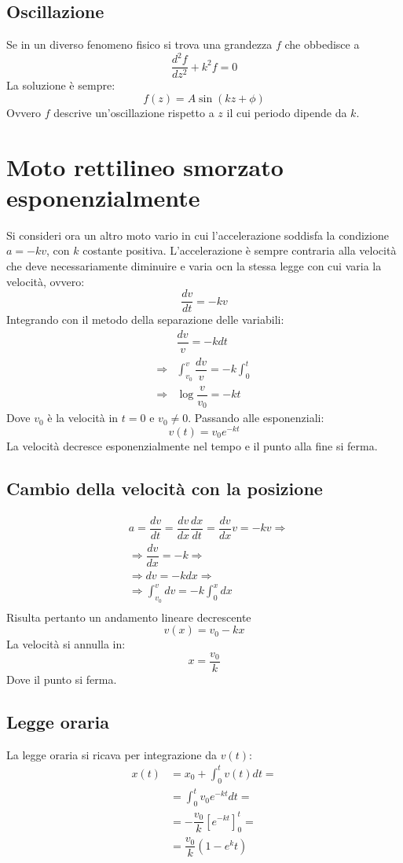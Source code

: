 \documentclass[class=book, crop=false, oneside, 12pt]{standalone}
\begin{document}
	\subsection{Oscillazione}
	Se in un diverso fenomeno fisico si trova una grandezza $f$ che obbedisce a
	$$\dfrac{d^2f}{dz^2}+k^2f=0$$
	La soluzione \`e sempre:
	$$f(z)=A\sin(kz+\phi)$$
	Ovvero $f$ descrive un'oscillazione rispetto a $z$ il cui periodo dipende da $k$.
\section{Moto rettilineo smorzato esponenzialmente}
Si consideri ora un altro moto vario in cui l'accelerazione soddisfa la condizione $a = -kv$, con $k$ costante positiva.
L'accelerazione \`e sempre contraria alla velocit\`a che deve necessariamente diminuire e varia ocn la stessa legge con cui varia la velocit\`a, ovvero:
$$\dfrac{dv}{dt} = -kv$$
Integrando con il metodo della separazione delle variabili:
\begin{align*}
	&\dfrac{dv}{v} = -kdt\\
	\Rightarrow&\int_{v_0}^v\dfrac{dv}{v} = -k\int_0^t\\
	\Rightarrow &\log\dfrac{v}{v_0} = -kt
\end{align*}
Dove $v_0$ \`e la velocit\`a in $t=0$ e $v_0\neq 0$.
Passando alle esponenziali:
$$v(t) = v_0e^{-kt}$$
La velocit\`a decresce esponenzialmente nel tempo e il punto alla fine si ferma.
	\subsection{Cambio della velocit\`a con la posizione}
	\begin{align*}
		&a = \dfrac{dv}{dt}=\dfrac{dv}{dx}\dfrac{dx}{dt}=\dfrac{dv}{dx}v = -kv\Rightarrow\\
		&\Rightarrow \dfrac{dv}{dx}=-k\Rightarrow\\
		&\Rightarrow dv = -kdx\Rightarrow\\
		&\Rightarrow \int_{v_0}^v dv = -k \int_0^xdx\\
	\end{align*}
	Risulta pertanto un andamento lineare decrescente
	$$v(x)=v_0-kx$$
	La velocit\`a si annulla in:
	$$x=\dfrac{v_0}{k}$$
	Dove il punto si ferma.
	\subsection{Legge oraria}
	La legge oraria si ricava per integrazione da $v(t)$:
	\begin{align*}
		x(t)&=x_0+\int_0^t v(t)dt=\\
		    &=\int_0^tv_0e^{-kt}dt=\\
				&=-\dfrac{v_0}{k}[e^{-kt}]_0^t=\\
				&=\dfrac{v_0}{k}(1-e^kt)
	\end{align*}
\end{document}

